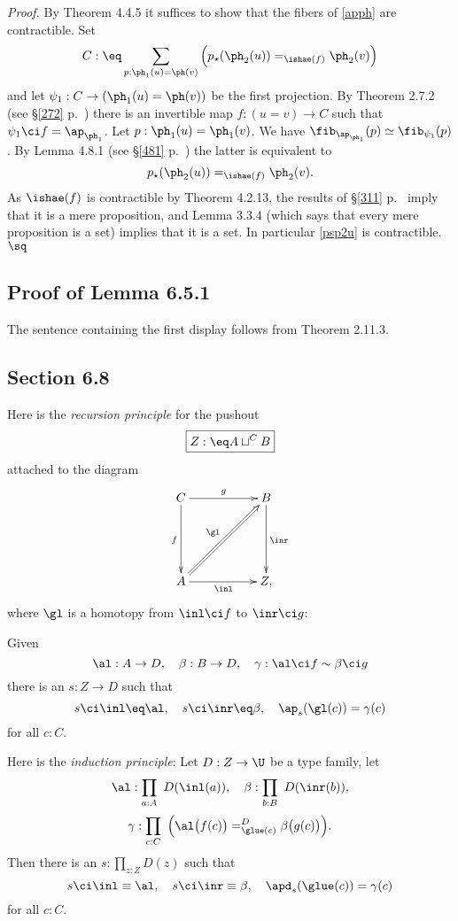 \documentclass[12pt]{article}
\begin{document}
\nn\emph{Proof.} By Theorem 4.4.5 it suffices to show that the fibers of \eqref{apph} are contractible. Set 
$$
C:\eq\sum_{p:\ph_1(u)=\ph(v)}\Big(p_\star(\ph_2(u))=_{\ishae(f)}\ph_2(v)\Big)
$$ 
and let $\psi_1:C\to(\ph_1(u)=\ph(v))$ be the first projection. By Theorem 2.7.2 (see \S\ref{272} p.~\pageref{272}) there is an invertible map $f:(u=v)\to C$ such that $\psi_1\ci f=\ap_{\ph_1}$. Let $p:\ph_1(u)=\ph_1(v)$. We have $\fib_{\ap_{\ph_1}}(p)\simeq\fib_{\psi_1}(p)$. By Lemma 4.8.1 (see \S\ref{481} p.~\pageref{481}) the latter is equivalent to 
\begin{equation}\label{psp2u}
p_\star(\ph_2(u))=_{\ishae(f)}\ph_2(v).
\end{equation}  
As $\ishae(f)$ is contractible by Theorem 4.2.13, the results of \S\ref{311} p.~\pageref{311} imply that it is a mere proposition, and Lemma 3.3.4 (which says that every mere proposition is a set) implies that it is a set. In particular \eqref{psp2u} is contractible. $\sq$


\subsection{Proof of Lemma 6.5.1}

The sentence containing the first display follows from Theorem 2.11.3.


\subsection{Section 6.8}

Here is the \emph{recursion principle} for the pushout 
$$
\boxed{Z:\eq A\sqcup^CB}
$$ 
attached to the diagram 
$$
\xymatrix{
C\ar[rr]^g\ar[dd]_f&&B\ar[dd]^{\inr}\\ \\ 
A\ar[rr]_{\inl}\ar@{=>}[uurr]^{\gl}&&Z,
}
$$ 
where $\gl$ is a homotopy from $\inl\ci f$ to $\inr\ci g$: 

Given 
$$
\al:A\to D,\quad\beta:B\to D,\quad\gamma:\al\ci f\sim\beta\ci g
$$ 
there is an $s:Z\to D$ such that 
$$
s\ci\inl\eq\al,\quad s\ci\inr\eq\beta,\quad\ap_s(\gl(c))=\gamma(c)
$$ 
for all $c:C$.

Here is the \emph{induction principle}: Let $D:Z\to\U$ be a type family, let 
$$
\al:\prod_{a:A}\ D(\inl(a)),\quad\beta:\prod_{b:B}\ D(\inr(b)),
$$
$$
\gamma:\prod_{c:C}\ \Big(\al\big(f(c)\big)=^D_{\glue(c)}\beta\big(g(c)\big)\Big).
$$ 
Then there is an $s:\prod_{z:Z}D(z)$ such that 
$$
s\ci\inl\equiv\al,\quad s\ci\inr\equiv\beta,\quad\apd_s(\glue(c))=\gamma(c)
$$ 
for all $c:C$. 
\end{document}
